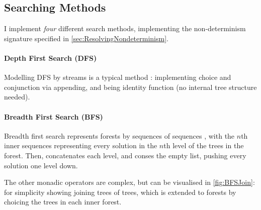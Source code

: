 \subsection{Searching Methods}\label{sec:SearchMethods}
I implement \textit{four} different search methods, implementing the non-determinism signature specified in \cref{sec:ResolvingNondeterminism}.

\paragraph{Depth First Search (DFS)}
Modelling DFS by streams is a typical method \cite{ListOfSuccess}: implementing choice and conjunction via appending, and  being identity function (no internal tree structure needed).

\paragraph{Breadth First Search (BFS)}
Breadth first search represents forests by sequences of sequences \cite{BFSCombinators}, with the $n$th inner sequences representing every solution in the $n$th level of the trees in the forest. Then,  concatenates each level, and  conses the empty list, pushing every solution one level down.

The other monadic operators are complex, but  can be visualised  in \cref{fig:BFSJoin}: for simplicity showing joining trees of trees, which is extended to forests by choicing the trees in each inner forest.

